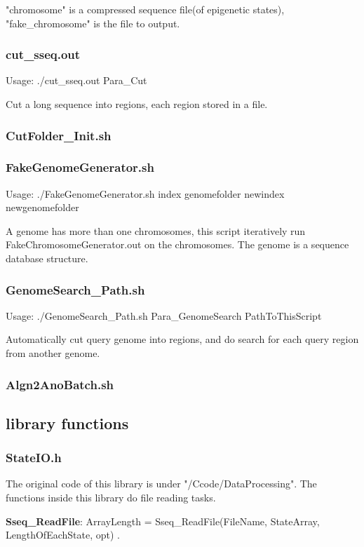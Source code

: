 \documentclass[a4paper]{article}
\begin{document}
\begin{CJK*}{UTF8}{kai}
"chromosome" is a compressed sequence file(of epigenetic states), "fake\_chromosome" is the file to output.

\subsubsection{cut\_sseq.out}

Usage: ./cut\_sseq.out Para\_Cut

Cut a long sequence into regions, each region stored in a file.

\subsubsection{CutFolder\_Init.sh}
\subsubsection{FakeGenomeGenerator.sh}

Usage: ./FakeGenomeGenerator.sh index genomefolder newindex newgenomefolder

A genome has more than one chromosomes, this script iteratively run FakeChromosomeGenerator.out on the chromosomes. The genome is a sequence database structure.

\subsubsection{GenomeSearch\_Path.sh}

Usage: ./GenomeSearch\_Path.sh Para\_GenomeSearch PathToThisScript

Automatically cut query genome into regions, and do search for each query region from another genome.

\subsubsection{Algn2AnoBatch.sh}

\subsection{library functions}
\subsubsection{StateIO.h}
The original code of this library is under "/Ccode/DataProcessing". The functions inside this library do file reading tasks.

\noindent
\textbf{Sseq\_ReadFile}: ArrayLength = Sseq\_ReadFile(FileName, StateArray, LengthOfEachState, opt) .


\end{CJK*}
\end{document}
